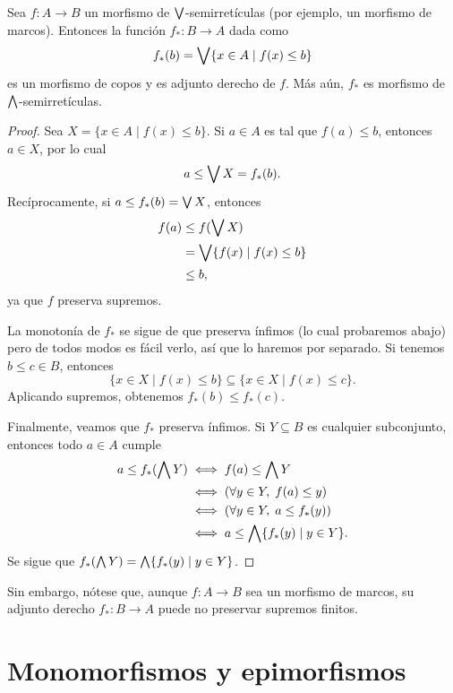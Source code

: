 \begin{lemma}
    Sea $f:A\to B$ un morfismo de $\bigvee$-semirretículas
    (por ejemplo, un morfismo de marcos).
    Entonces la función $f_*:B\to A$ dada como
    \[
        f_*(b) = \bigvee\{x\in A \mid f(x)\leq b\} 
    \]
    es un morfismo de copos y es adjunto derecho de $f$.
    Más aún, $f_*$ es morfismo de $\bigwedge$-semirretículas.
\end{lemma}
\begin{proof}
    Sea $X=\{x\in A\mid f(x)\leq b\}$.
    Si $a\in A$ es tal que $f(a)\leq b$, entonces $a\in X$,
    por lo cual
    \[
        a\leq \bigvee X= f_*(b)
    .\]
    Recíprocamente, si $a\leq f_*(b)=\bigvee X$, entonces
    \begin{align*}
        f(a)
        &\leq f(\bigvee X) \\
        &= \bigvee\{f(x)\mid f(x)\leq b\} \\
        &\leq b,
    \end{align*}
    ya que $f$ preserva supremos.

    La monotonía de $f_*$ se sigue de que preserva ínfimos (lo
    cual probaremos abajo) pero de todos modos es fácil verlo,
    así que lo haremos por separado.
    Si tenemos $b\leq c\in B$, entonces
    \[
        \{x\in X\mid f(x)\leq b\} \subseteq
        \{x\in X\mid f(x)\leq c\}.
    \]
    Aplicando supremos, obtenemos $f_*(b)\leq f_*(c)$.
    
    Finalmente, veamos que $f_*$ preserva ínfimos.
    Si $Y\subseteq B$ es cualquier subconjunto,
    entonces todo $a\in A$ cumple
    \begin{align*}
        a\leq f_*(\bigwedge Y)
        &\iff f(a)\leq \bigwedge Y \\
        &\iff (\forall y\in Y,\; f(a)\leq y) \\
        &\iff (\forall y\in Y,\; a\leq f_*(y)) \\
        &\iff a\leq \bigwedge\{f_*(y) \mid y\in Y\}.
    \end{align*}
    Se sigue que $f_*(\bigwedge Y)=\bigwedge\{f_*(y)\mid y\in Y\}$.
\end{proof}

Sin embargo, nótese que, aunque $f:A\to B$ sea un morfismo
de marcos, su adjunto derecho $f_*:B\to A$
puede no preservar supremos finitos.

\section{Monomorfismos y epimorfismos}

